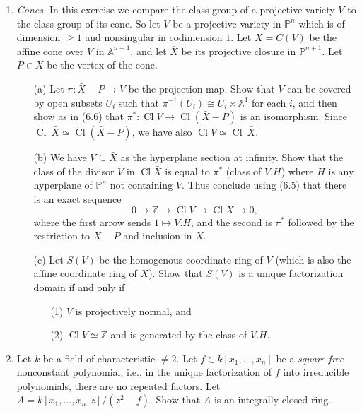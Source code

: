 \documentclass{article}
\newcommand{\PP}{\mathbb{P}}
\newcommand{\Z}{\mathbb{Z}}
\DeclareMathOperator{\cl}{Cl}
\begin{document}
\begin{enumerate} [label=\textbf{\arabic*.}, leftmargin=0em]
\item \textit{Cones.} In this exercise we compare the class group of a projective variety $V$ to the class group of its cone. So let $V$ be a projective variety in $\PP^n$ which is of dimension $\geq 1$ and nonsingular in codimension $1$. Let $X = C(V)$ be the affine cone over $V$ in $\mathbb{A}^{n + 1}$, and let $\bar{X}$ be its projective closure in $\PP^{n + 1}$. Let $P \in X$ be the vertex of the cone.
\begin{itemize}
    \item[(a)] Let $\pi : \bar{X} - P \to V$ be the projection map. Show that $V$ can be covered by open subsets $U_i$ such that $\pi^{-1}(U_i) \cong U_i \times \mathbb{A}^1$ for each $i$, and then show as in (6.6) that $\pi^* : \cl V \to \cl(\bar{X} - P)$ is an isomorphism. Since $\cl~\bar{X} \simeq \cl(\bar{X} - P)$, we have also $\cl V \simeq \cl~\bar{X}$.
    \item[(b)] We have $V \subseteq \bar{X}$ as the hyperplane section at infinity. Show that the class of the divisor $V$ in $\cl \bar{X}$ is equal to $\pi^*$ (class of $V.H$) where $H$ is any hyperplane of $\PP^n$ not containing $V$. Thus conclude using (6.5) that there is an exact sequence
    \begin{equation*}
        0 \to \Z \to \cl V \to \cl X \to 0,
    \end{equation*}
    where the first arrow sends $1 \mapsto V.H$, and the second is $\pi^*$ followed by the restriction to $X - P$ and inclusion in $X$.
    \item[(c)] Let $S(V)$ be the homogenous coordinate ring of $V$ (which is also the affine coordinate ring of $X$). Show that $S(V)$ is a unique factorization domain if and only if
    \begin{itemize}
        \item[(1)] $V$ is projectively normal, and
        \item[(2)] $\cl V \simeq \Z$ and is generated by the class of $V.H$.
    \end{itemize}
\end{itemize}

\item Let $k$ be a field of characteristic $\neq 2$. Let $f \in k[x_1, \dots, x_n]$ be a \textit{square-free} nonconstant polynomial, i.e., in the unique factorization of $f$ into irreducible polynomials, there are no repeated factors. Let $A = k[x_1, \dots, x_n, z] / (z^2 - f)$. Show that $A$ is an integrally closed ring.


\end{enumerate}
\end{document}
